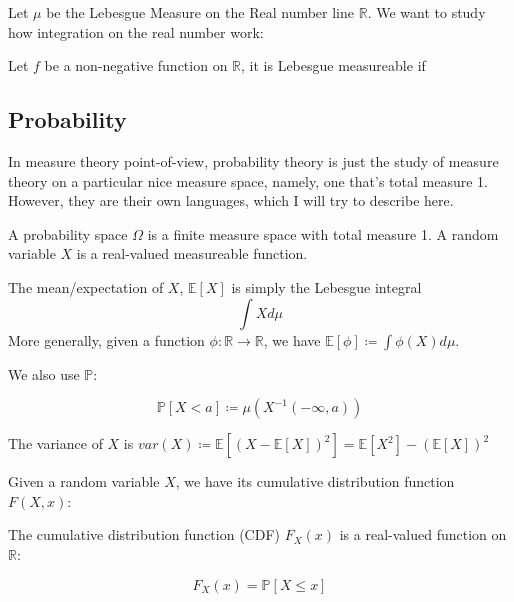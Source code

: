 \documentclass[main.tex]{subfiles}
\begin{document}
Let $\mu$ be the Lebesgue Measure on the Real number line $\mathbb{R}$. We want to study how integration on the real number work:

\begin{definition}
Let $f$ be a non-negative function on $\mathbb{R}$, it is Lebesgue measureable if 
\end{definition}



\subsection{Probability}
In measure theory point-of-view, probability theory is just the study of measure theory on a particular nice measure space, namely, one that's total measure 1. However, they are their own languages, which I will try to describe here.

\begin{defintion}

A probability space $\Omega$ is a finite measure space with total measure 1. A random variable $X$ is a real-valued measureable function.
\end{defintion}


\begin{definition}
The mean/expectation of $X$, $\mathbb{E}[X]$ is simply the Lebesgue integral 
$$
\int X d\mu
$$
More generally, given a function $\phi: \mathbb{R} \rightarrow \mathbb{R}$, we have $\mathbb{E}[\phi] \coloneqq \int \phi(X) d\mu$. 
\end{definition}

We also use $\mathbb{P}$:
\begin{definition}
$$
\mathbb{P}[X < a] \coloneqq \mu (X^{-1}(-\infty, a))
$$
\end{definition}
\begin{definition}
The variance of $X$ is $var(X) \coloneqq \mathbb{E}[(X - \mathbb{E}[X])^2] = \mathbb{E}[X^2] - (\mathbb{E}[X])^2$
\end{definition}

Given a random variable $X$, we have its cumulative distribution function $F(X,x)$:

\begin{definition}
The cumulative distribution function (CDF) $F_X(x)$ is a real-valued function on $\mathbb{R}$: 

$$
F_X(x) = \mathbb{P}[X \leq x]
$$

\end{definition}
\end{document}
